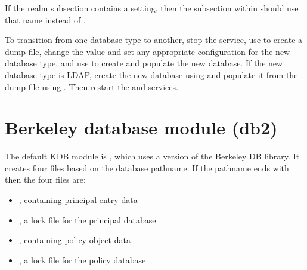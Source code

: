 \documentclass[letterpaper,10pt,english]{sphinxmanual}
\begin{document}
%
\begin{sphinxVerbatim}[commandchars=\\\{\}]
\PYG{p}{[}\PYG{p}{]}
      
          
\end{sphinxVerbatim}

If the  realm subsection contains a
 setting, then the subsection within
\sphinxcode{{[}dbmodules{]}} should use that name instead of .

To transition from one database type to another, stop the
{\hyperref[\detokenize{admin/admin_commands/kadmind:kadmind-8}]{}} service, use  to create a dump
file, change the  value and set any appropriate
configuration for the new database type, and use  to
create and populate the new database.  If the new database type is
LDAP, create the new database using  and populate it
from the dump file using .  Then restart the
{\hyperref[\detokenize{admin/admin_commands/krb5kdc:krb5kdc-8}]{}} and {\hyperref[\detokenize{admin/admin_commands/kadmind:kadmind-8}]{}} services.


\section{Berkeley database module (db2)}
\label{\detokenize{admin/dbtypes:berkeley-database-module-db2}}
The default KDB module is , which uses a version of the
Berkeley DB library.  It creates four files based on the database
pathname.  If the pathname ends with  then the four files
are:
\begin{itemize}
\item {} 
, containing principal entry data

\item {} 
, a lock file for the principal database

\item {} 
, containing policy object data

\item {} 
, a lock file for the policy database

\end{itemize}
\end{document}
